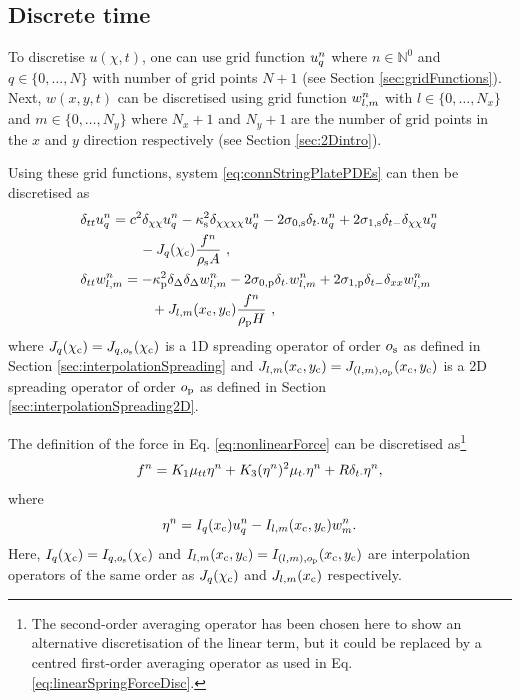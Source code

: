 \subsection{Discrete time}
To discretise $u(\chi, t)$, one can use grid function $u_q^n$ where $n\in\mathbb{N}^0$ and $q\in\{0, \hdots, N\}$ with number of grid points $N+1$ (see Section \ref{sec:gridFunctions}). Next, $w(x, y, t)$ can be discretised using grid function $w_{l,m}^n$ with $l \in \{0, \hdots, N_x\}$ and $m \in \{0, \hdots, N_y\}$ where $N_x+1$ and $N_y+1$ are the number of grid points in the $x$ and $y$ direction respectively (see Section \ref{sec:2Dintro}). 

Using these grid functions, system \eqref{eq:connStringPlatePDEs} can then be discretised as
\begin{align}\label{eq:connStringPlateFDSs}
    &\begin{aligned}
        \dtt \uqn &= c^2 \dcc \uqn - \kappa_\stxt^2 \dcccc \uqn - 2\szX[\stxt]\dtd \uqn + 2\soX[\stxt] \dtm\dcc \uqn \\
        &\qquad - J_q(\chi_\ctxt)\frac{f^n}{\rho_\stxt A}\ ,
    \end{aligned}\\
    &\begin{aligned}
        \dtt \wlmn &= -\kappa_\ptxt^2\dDelta\dDelta \wlmn - 2\szX[\ptxt]\dtd \wlmn + 2\soX[\ptxt] \dtm\dxx \wlmn \\
        &\qquad + J_{l, m}(x_\ctxt, y_\ctxt)\frac{f^n}{\rho_\ptxt H}\ ,
    \end{aligned}
\end{align}
where $J_q(\chi_{\text{c}}) = J_{q, o_{\text{s}}} (\chi_{\text{c}})$ is a 1D spreading operator of order $o_{\text{s}}$ as defined in Section \ref{sec:interpolationSpreading} and $J_{l, m}(x_{\text{c}}, y_{\text{c}}) = J_{(l, m), o_{\text{p}}}(x_{\text{c}}, y_{\text{c}})$ is a 2D spreading operator of order $o_{\text{p}}$ as defined in Section \ref{sec:interpolationSpreading2D}. 

The definition of the force in Eq. \eqref{eq:nonlinearForce} can be discretised as\footnote{The second-order averaging operator has been chosen here to show an alternative discretisation of the linear term, but it could be replaced by a centred first-order averaging operator as used in Eq. \eqref{eq:linearSpringForceDisc}.}
\begin{equation}\label{eq:discForceStringPlate}
    f^n = K_1\mu_{tt}\eta^n+K_3(\eta^n)^2\mu_{t\cdot}\eta^n+R\delta_{t\cdot}\eta^n,
\end{equation}
where
\begin{equation}\label{eq:discEtaStringPlate}
    \eta^n = I_q(x_{\text{c}})u_q^n - I_{l, m}(x_{\text{c}}, y_{\text{c}})w_m^n.
\end{equation}
Here, $I_q(\chi_{\text{c}}) = I_{q, o_{\text{s}}} (\chi_{\text{c}})$ and $I_{l, m}(x_{\text{c}}, y_{\text{c}}) = I_{(l, m), o_{\text{p}}}(x_{\text{c}}, y_{\text{c}})$ are interpolation operators of the same order as $J_q(\chi_{\text{c}})$ and $J_{l,m}(x_{\text{c}})$ respectively. 


